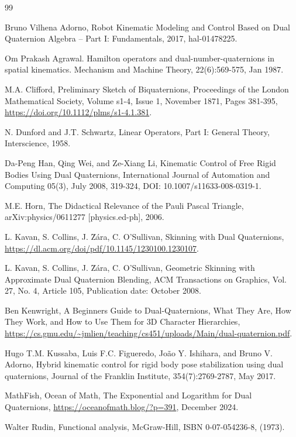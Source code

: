 \documentclass[12pt,reqno]{amsart}
\begin{document}
\begin{thebibliography}{99}

 Bruno Vilhena Adorno, Robot Kinematic Modeling and Control Based on Dual Quaternion Algebra -- Part I: Fundamentals, 2017, hal-01478225.

 Om Prakash Agrawal. Hamilton operators and dual-number-quaternions in spatial kinematics. Mechanism and Machine Theory, 22(6):569-575, Jan 1987.

 M.A. Clifford, Preliminary Sketch of Biquaternions, Proceedings of the London Mathematical Society, Volume s1-4, Issue 1, November 1871, Pages 381-395, \url{https://doi.org/10.1112/plms/s1-4.1.381}.

 N. Dunford and J.T. Schwartz, Linear Operators, Part I: General Theory, Interscience, 1958.

 Da-Peng Han, Qing Wei, and Ze-Xiang Li, Kinematic Control of Free Rigid Bodies Using Dual Quaternions, International Journal of Automation and Computing
05(3), July 2008, 319-324, DOI: 10.1007/s11633-008-0319-1.

 M.E. Horn, The Didactical Relevance of the Pauli Pascal Triangle, arXiv:physics/0611277 [physics.ed-ph], 2006.

 L. Kavan, S. Collins, J. \u Z\'ara, C. O'Sullivan, Skinning with Dual Quaternions, \url{https://dl.acm.org/doi/pdf/10.1145/1230100.1230107}.

 L. Kavan, S. Collins, J. \u Z\'ara, C. O'Sullivan, Geometric Skinning with Approximate Dual Quaternion Blending, ACM Transactions on Graphics, Vol. 27, No. 4, Article 105, Publication date: October 2008.

 Ben Kenwright, A Beginners Guide to Dual-Quaternions, What They Are, How They Work, and How to Use Them for 3D Character Hierarchies, \url{https://cs.gmu.edu/~jmlien/teaching/cs451/uploads/Main/dual-quaternion.pdf}.

 Hugo T.M. Kussaba, Luis F.C. Figueredo, Jo\~ao Y. Ishihara, and Bruno V. Adorno, Hybrid kinematic control for rigid body pose stabilization using dual quaternions, Journal of the Franklin Institute, 354(7):2769-2787, May 2017.

 MathFish, Ocean of Math, The Exponential and Logarithm for Dual Quaternions, \url{https://oceanofmath.blog/?p=391}, December 2024.

 Walter Rudin, Functional analysis, McGraw-Hill, ISBN 0-07-054236-8, (1973).


\end{thebibliography}
\end{document}
